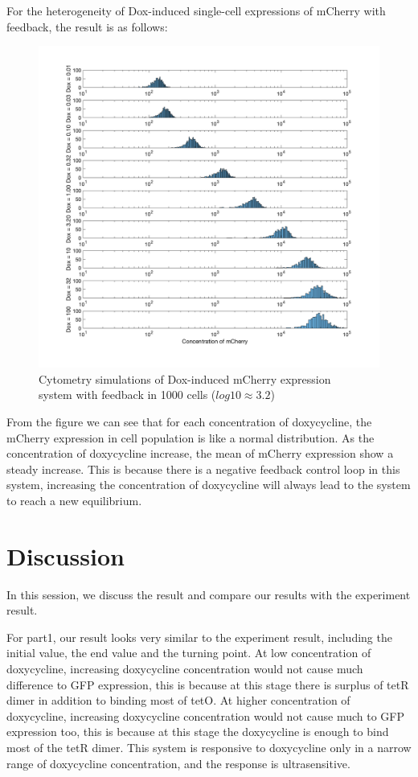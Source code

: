 For the heterogeneity of Dox-induced single-cell expressions of mCherry with feedback, the result is as follows:

\begin{figure}[H]
\centering
\includegraphics[width=1.0\linewidth]{Figures/Q3_2.png}
\caption{Cytometry simulations of Dox-induced mCherry expression \\system with feedback in 1000 cells ($log10 \approx 3.2$)}
\label{part_3_2}
\end{figure}

From the ﬁgure we can see that for each concentration of doxycycline, the mCherry expression in cell population is like a normal distribution. As the concentration of doxycycline increase, the mean of mCherry expression show a steady increase. This is because there is a negative feedback control loop in this system, increasing the concentration of doxycycline will always lead to the system to reach a new equilibrium.

\newpage
\section{Discussion}
In this session, we discuss the result and compare our results with the experiment result.

For part1, our result looks very similar to the experiment result, including the initial value, the end value and the turning point. At low concentration of doxycycline, increasing doxycycline concentration would not cause much difference to GFP expression, this is because at this stage there is surplus of tetR dimer in addition to binding most of tetO. At higher concentration of doxycycline, increasing doxycycline concentration would not cause much to GFP expression too, this is because at this stage the doxycycline is enough to bind most of the tetR dimer. This system is responsive to doxycycline only in a narrow range of doxycycline concentration, and the response is ultrasensitive.

